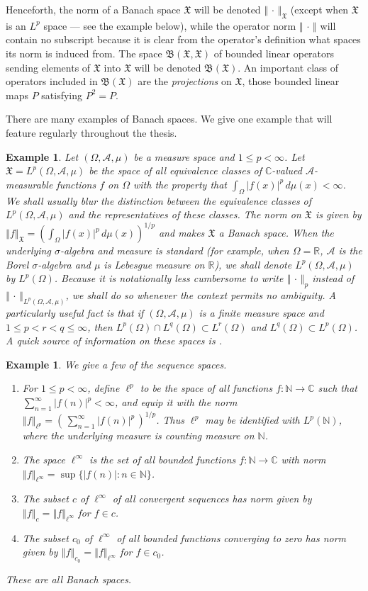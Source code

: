 \documentclass[mstat,12pt]{unswthesis}  %
\newcommand{\R}{\mathbb{R}}
\newcommand{\C}{\mathbb{C}}
\newcommand{\N}{\mathbb{N}}
\newcommand{\B}{\mathfrak{B}}
\newcommand{\X}{\mathfrak{X}}
\newcommand{\A}{\mathcal{A}}
\def\lp{\ell^p}
\def\norm#1{\left \Vert #1 \right \Vert}
\newtheorem{example}[theorem]{Example}
\numberwithin{equation}{section}
\begin{document}
Henceforth, the norm of a Banach space $\X$ will be denoted
$\norm{\,\cdot\,}_{\X}$ (except when $\X$ is an $L^p$ space --- see the
example below), while the operator norm $\norm{\,\cdot\,}$ will
contain no subscript because it is clear from the operator's definition what
spaces its norm is induced from. The space $\B(\X,\X)$ of bounded linear
operators sending elements of $\X$ into $\X$ will be denoted $\B(\X)$. An
important class of operators included in $\B(\X)$ are the {\em projections} on
$\X$, those bounded linear maps $P$ satisfying $P^2=P$.

There are many examples of Banach spaces. We give one example that will feature
regularly throughout the thesis.

\begin{example}\label{L^p example}
Let $(\Omega,\A,\mu)$ be a measure space and $1\leq p<\infty$. Let
$\X=L^p(\Omega,\A,\mu)$ be the space of all equivalence classes of
$\C$-valued $\A$-measurable functions $f$ on $\Omega$ with the property that
$\int_{\Omega}|f(x)|^p\,d\mu(x)<\infty$. We shall usually blur the distinction
between the equivalence classes of $L^p(\Omega,\A,\mu)$ and the representatives
of these classes. The norm on $\X$ is given by
$\norm{f}_{\X}=(\int_{\Omega}|f(x)|^p\,d\mu(x))^{1/p}$ and
makes $\X$ a Banach space. When the underlying $\sigma$-algebra and measure is
standard (for example, when $\Omega=\R$, $\A$ is the Borel $\sigma$-algebra
and $\mu$ is Lebesgue measure on $\R$), we shall denote
$L^p(\Omega,\A,\mu)$ by $L^p(\Omega)$. 
Because it
is notationally less cumbersome to write $\norm{\,\cdot\,}_p$ instead of
$\norm{\,\cdot\,}_{L^p(\Omega,\A,\mu)}$, we shall do so whenever the context
permits no ambiguity. A particularly useful fact is that if $(\Omega,\A,\mu)$ is
a finite measure space and $1\leq p<r<q\leq\infty$, then
$L^p(\Omega)\cap L^q(\Omega)\subset L^r(\Omega)$ and
$L^q(\Omega)\subset L^p(\Omega)$. A quick source of information on these spaces
is \cite[\S 6.4]{Pedersen}.
\end{example}

\begin{example}
We give a few of the sequence spaces. 
\begin{enumerate}
\item For $1\leq p<\infty$, define $\lp$ to be
the space of all functions $f:\N\rightarrow\C$ such that
$\sum_{n=1}^{\infty}|f(n)|^p<\infty$, and equip it with the norm
$\norm{f}_{\lp}=(\,\sum_{n=1}^{\infty}|f(n)|^p\,)^{1/p}$. Thus $\lp$ may be
identified with $L^p(\N)$, where the underlying measure is counting measure on
$\N$.
\item The space $\ell^{\infty}$ is the set of all bounded functions
$f:\N\rightarrow\C$ with norm $\norm{f}_{\ell^{\infty}}=\sup\{|f(n)|:n\in\N\}$.
\item The subset $c$ of $\ell^{\infty}$ of all convergent sequences 
has norm given by $\norm{f}_c=\norm{f}_{\ell^{\infty}}$ for $f\in c$.
\item The subset $c_0$ of $\ell^{\infty}$ of all bounded functions converging to
zero has norm given by $\norm{f}_{c_0}=\norm{f}_{\ell^{\infty}}$ for $f\in c_0$.
\end{enumerate}These are all Banach spaces.
\end{example}
\end{document}
